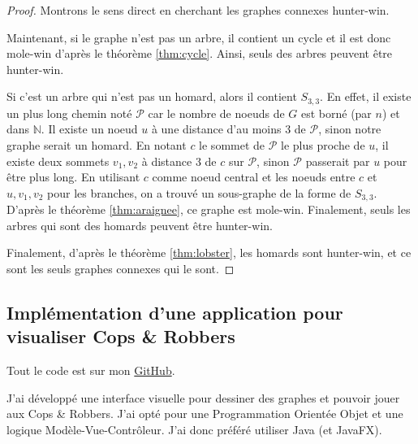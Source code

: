 \documentclass[12pt]{article}
\newcommand{\N}{\mathbb{N}}
\renewcommand{\P}{\mathcal{P}}
\newcommand{\cp}{Cops \& Robbers\xspace}
\begin{document}
\begin{proof}
Montrons le sens direct en cherchant les graphes connexes hunter-win.

Maintenant, si le graphe n'est pas un arbre, il contient un cycle et il est donc mole-win d'après le théorème \ref{thm:cycle}. Ainsi, seuls des arbres peuvent être hunter-win.

Si c'est un arbre qui n'est pas un homard, alors il contient $S_{3,3}$. En effet, il existe un plus long chemin noté $\P$ car le nombre de noeuds de $G$ est borné (par $n$) et dans $\N$. Il existe un noeud $u$ à une distance d'au moins 3 de $\P$, sinon notre graphe serait un homard. En notant $c$ le sommet de $\P$ le plus proche de $u$, il existe deux sommets $v_1,v_2$ à distance 3 de $c$ sur $\P$, sinon $\P$ passerait par $u$ pour être plus long. En utilisant $c$ comme noeud central et les noeuds entre $c$ et $u,v_1,v_2$ pour les branches, on a trouvé un sous-graphe de la forme de $S_{3,3}$. D'après le théorème \ref{thm:araignee}, ce graphe est mole-win. Finalement, seuls les arbres qui sont des homards peuvent être hunter-win.

Finalement, d'après le théorème \ref{thm:lobster}, les homards sont hunter-win, et ce sont les seuls graphes connexes qui le sont.
\end{proof}

\subsection{Implémentation d'une application pour visualiser \cp}

Tout le code est sur mon \href{https://github.com/MathProuv/IFT3150}{GitHub}.

J'ai développé une interface visuelle pour dessiner des graphes et pouvoir jouer aux \cp. J'ai opté pour une Programmation Orientée Objet et une logique Modèle-Vue-Contrôleur. J'ai donc préféré utiliser Java (et JavaFX).
\end{document}
